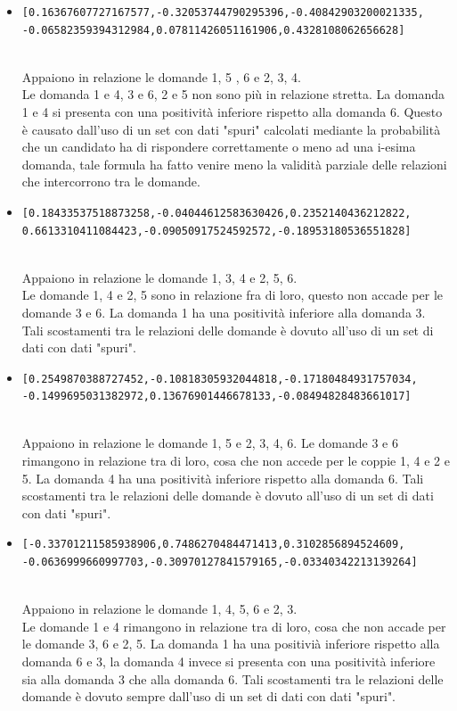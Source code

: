\documentclass[10pt,a4paper]{article}
\begin{document}
\begin{itemize}

\item \begin{verbatim}[0.16367607727167577,-0.32053744790295396,-0.40842903200021335,
-0.06582359394312984,0.07811426051161906,0.4328108062656628] \end{verbatim}\\
Appaiono in relazione le domande 1, 5 , 6 e 2, 3, 4.\\
Le domanda 1 e 4, 3 e 6, 2 e 5 non sono pi\`u in relazione stretta. La domanda 1 e 4 si presenta con una positivit\`a inferiore rispetto alla domanda 6. Questo \`e causato dall'uso di un set con dati "spuri" calcolati mediante la probabilit\`a che un candidato ha di rispondere correttamente o meno ad una i-esima domanda, tale formula ha fatto venire meno la validit\`a parziale delle relazioni che intercorrono tra le domande.


\item \begin{verbatim}[0.18433537518873258,-0.04044612583630426,0.2352140436212822,
0.6613310411084423,-0.09050917524592572,-0.18953180536551828] \end{verbatim}\\
Appaiono in relazione le domande 1, 3, 4 e 2, 5, 6.\\
Le domande 1, 4 e 2, 5 sono in relazione fra di loro, questo non accade per le domande 3 e 6. La domanda 1 ha una positivit\`a inferiore alla domanda 3. Tali scostamenti tra le relazioni delle domande \`e dovuto all'uso di un set di dati con dati "spuri".

\item \begin{verbatim}[0.2549870388727452,-0.10818305932044818,-0.17180484931757034,
-0.1499695031382972,0.13676901446678133,-0.08494828483661017] \end{verbatim}\\
Appaiono in relazione le domande 1, 5 e 2, 3, 4, 6.
Le domande 3 e 6 rimangono in relazione tra di loro, cosa che non accede per le coppie 1, 4 e 2 e 5. La domanda 4 ha una positivit\`a inferiore rispetto alla domanda 6.  Tali scostamenti tra le relazioni delle domande \`e dovuto all'uso di un set di dati con dati "spuri".

\item \begin{verbatim}[-0.33701211585938906,0.7486270484471413,0.3102856894524609,
-0.0636999660997703,-0.30970127841579165,-0.03340342213139264] \end{verbatim}\\
Appaiono in relazione le domande 1, 4, 5, 6 e 2, 3.\\
Le domande 1 e 4 rimangono in relazione tra di loro, cosa che non accade per le domande 3, 6 e 2, 5. La domanda 1 ha una positivi\`a inferiore rispetto alla domanda 6 e 3, la domanda 4 invece si presenta con una positivit\`a inferiore sia alla domanda 3 che alla domanda 6. Tali scostamenti tra le relazioni delle domande \`e dovuto sempre dall'uso di un set di dati con dati "spuri".

\end{itemize}
\end{document}
